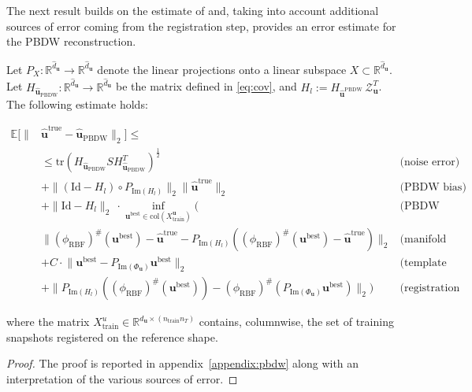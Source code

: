 The next result builds on the estimate of \cite{gong2019pbdw} and, taking into account additional sources of error coming from the registration step, 
provides an error estimate for the PBDW reconstruction.
\begin{theorem}
  \label{theo:pbdwmsq}
Let $P_X:\mathbb{R}^{\widehat{d}_{\mathbf u}}\rightarrow\mathbb{R}^{\widehat{d}_{\mathbf u}}$ denote the linear projections onto a linear subspace $X\subset\mathbb{R}^{\widehat{d}_{\mathbf u}}$. Let $H_{\widehat{\mathbf{u}}_{\text{PBDW}}}:\mathbb{R}^{\widehat{d}_{\mathbf u}}\rightarrow\mathbb{R}^{\widehat{d}_{\mathbf u}}$ be the matrix defined in \eqref{eq:cov}, and
$H_l := H_{\widehat{\mathbf{u}}^{\text{PBDW}}} \, \mathcal Z_{\mathbf u}^T$. %
%
The following estimate holds: 
  \begin{linenomath}\begin{align*}
    \mathbb{E}[\lVert &\widehat{\mathbf{u}}^{\text{true}}-\widehat{\mathbf{u}}_{\text{PBDW}}\rVert_2]\leq &\\
    &\leq\text{tr}(H_{\widehat{\mathbf{u}}_{\text{PBDW}}}SH_{\widehat{\mathbf{u}}_{\text{PBDW}}}^T)^{\tfrac{1}{2}} &\text{(noise error)}\\
    &+\lVert(\text{Id}-H_l)\circ P_{\text{Im}(H_l)}\rVert_2\lVert \widehat{\mathbf{u}}^{\text{true}}\rVert_2&\text{(PBDW bias)}\\
    &+\lVert\text{Id}-H_l\rVert_2 \ \cdot \inf_{{\mathbf u}^{\text{best}}\in\text{col}(X_{\text{train}}^{\mathbf{u}})}\big(&\text{(PBDW stability constant)}\\
    &\lVert(\phi_{\text{RBF}})^{\#}({\mathbf u}^{\text{best}})-\widehat{\mathbf{u}}^{\text{true}}-P_{{\text{Im}(H_l)}}((\phi_{\text{RBF}})^{\#}({\mathbf u}^{\text{best}})-\widehat{\mathbf{u}}^{\text{true}})\rVert_2&\text{(manifold approximation error)}\\
    &+ C\cdot\lVert {\mathbf u}^{\text{best}}-P_{\text{Im}(\Phi_{\mathbf u})} {\mathbf u}^{\text{best}}\rVert_2&\text{(template rSVD approximation error)}\\
    &+\lVert P_{\text{Im}(H_l)}\left((\phi_{\text{RBF}})^{\#}({\mathbf u}^{\text{best}})\right)-(\phi_{\text{RBF}})^{\#}(P_{\text{Im}(\Phi_{\mathbf u})}{\mathbf u}^{\text{best}})\rVert_2\big)&\text{(registration degradation error)}
  \end{align*}\end{linenomath}
  where the matrix $X_{\text{train}}^{u}\in\mathbb{R}^{d_{\mathbf u}\times (n_{\text{train}}n_T)}$ contains, columnwise, the set of training snapshots registered on the reference shape.
  
\end{theorem}
\begin{proof}
  The proof is reported in appendix~\ref{appendix:pbdw} along with an interpretation of the various sources of error.
\end{proof}

